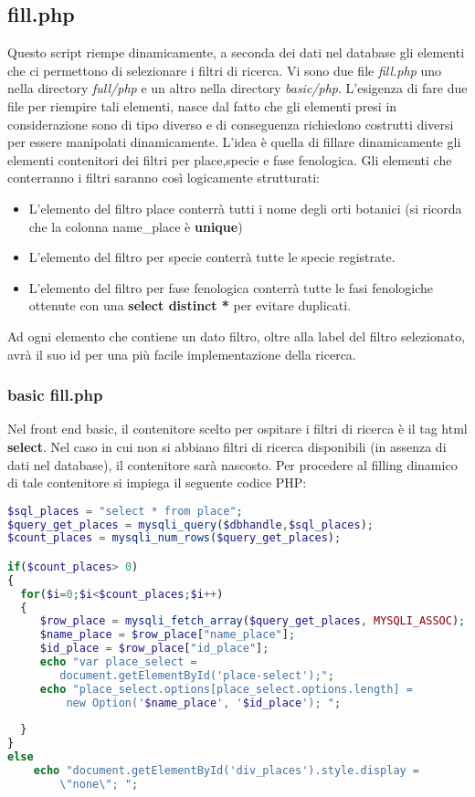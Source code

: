 \subsection{fill.php}
Questo script riempe dinamicamente, a seconda dei dati nel database gli elementi che ci permettono di selezionare i filtri di ricerca. \newline
Vi sono due file \textit{fill.php} uno nella directory \textit{full/php} e un altro nella directory \textit{basic/php}. L'esigenza di fare due file per riempire tali elementi, nasce dal fatto che gli elementi presi in considerazione sono di tipo diverso e di conseguenza richiedono costrutti diversi per essere manipolati dinamicamente.\newline
L'idea è quella di fillare dinamicamente gli elementi contenitori dei filtri per place,specie e fase fenologica. Gli elementi che conterranno i filtri saranno così logicamente strutturati:
\begin{itemize}
\item L'elemento del filtro place conterrà tutti i nome degli orti botanici (si ricorda che la colonna name\_place è \textbf{unique})
\item L'elemento del filtro per specie conterrà tutte le specie registrate.
\item L'elemento del filtro per fase fenologica conterrà tutte le fasi fenologiche ottenute con una \textbf{select distinct *} per evitare duplicati.
\end{itemize}
Ad ogni elemento che contiene un dato filtro, oltre alla label del filtro selezionato, avrà il suo id per una più facile implementazione della ricerca. 
\subsubsection{basic fill.php}
Nel front end basic, il contenitore scelto per ospitare i filtri di ricerca è il tag html \textbf{select}. Nel caso in cui non si abbiano filtri di ricerca disponibili (in assenza di dati nel database), il contenitore sarà nascosto.
Per procedere al filling dinamico di tale contenitore si impiega il seguente codice PHP:

\begin{lstlisting}[language=PHP , caption= Filling Dinamico per i place - select element]
$sql_places = "select * from place";
$query_get_places = mysqli_query($dbhandle,$sql_places); 
$count_places = mysqli_num_rows($query_get_places);

if($count_places> 0)
{
  for($i=0;$i<$count_places;$i++)
  {
	 $row_place = mysqli_fetch_array($query_get_places, MYSQLI_ASSOC);
	 $name_place = $row_place["name_place"];
	 $id_place = $row_place["id_place"]; 
	 echo "var place_select = 
	 	document.getElementById('place-select');";
	 echo "place_select.options[place_select.options.length] =
	 	 new Option('$name_place', '$id_place'); ";
		
  }
}
else
	echo "document.getElementById('div_places').style.display = 
		\"none\"; ";
\end{lstlisting}

